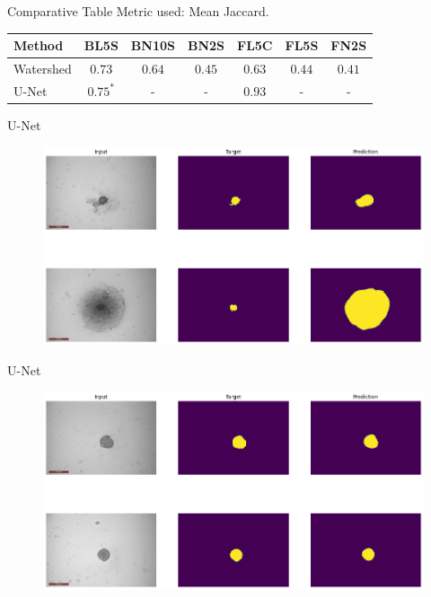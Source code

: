 \begin{frame}{Comparative Table}
    Metric used: \alert{Mean Jaccard}.
    \begin{table}[]
        \centering
        \setlength{\tabcolsep}{10pt}
        
        {
            \begin{tabular}{lcccccc}
                Method & BL5S & BN10S & BN2S & FL5C & FL5S & FN2S \\
                \midrule
                Watershed & $0.73$ & $0.64$ & $0.45$ &  $0.63$ & $0.44$ & $0.41$ \\
                U-Net & $0.75^*$ & - & - & $0.93$ & - & -
            \end{tabular}
        }
    \end{table}
\end{frame}

\begin{frame}{U-Net}
    \begin{figure}[!htb]
        \centering
        \includegraphics[width=13cm]{figures/result/wrong_example}
    \end{figure}
\end{frame}


\begin{frame}{U-Net}
    \begin{figure}[!htb]
        \centering
        \includegraphics[width=13cm]{figures/result/better_example}
    \end{figure}
\end{frame}
